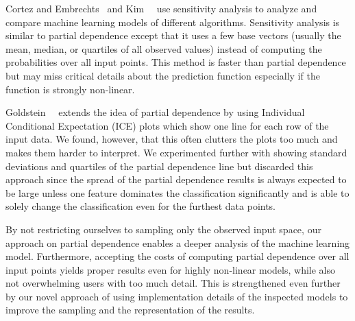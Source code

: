 Cortez and Embrechts~\cite{cortez11,Cortez20131} and Kim~\etal~\cite{kim2014bayesian}
use sensitivity analysis to analyze and compare machine learning models of different algorithms.
Sensitivity analysis is similar to partial dependence except that it uses a few
base vectors (usually the mean, median, or quartiles of all observed values)
instead of computing the probabilities over all input points.
This method is faster than partial dependence but may miss critical details
about the prediction function especially if the function is strongly non-linear.

Goldstein~\etal~\cite{goldstein14} extends the idea of partial dependence by using
Individual Conditional Expectation (ICE) plots which show one line for each row of the input data.
We found, however, that this often clutters the plots too much and makes them harder to interpret.
We experimented further with showing standard deviations and quartiles of the partial dependence line
but discarded this approach since the spread of the partial dependence results is always expected to
be large unless one feature dominates the classification significantly and is able to solely change
the classification even for the furthest data points.

By not restricting ourselves to sampling only the observed input space, our approach on partial dependence
enables a deeper analysis of the machine learning model. Furthermore, accepting the costs of computing
partial dependence over all input points yields proper results even for highly non-linear models,
while also not overwhelming users with too much detail.
This is strengthened even further by our novel approach of using implementation details of the inspected
models to improve the sampling and the representation of the results.
